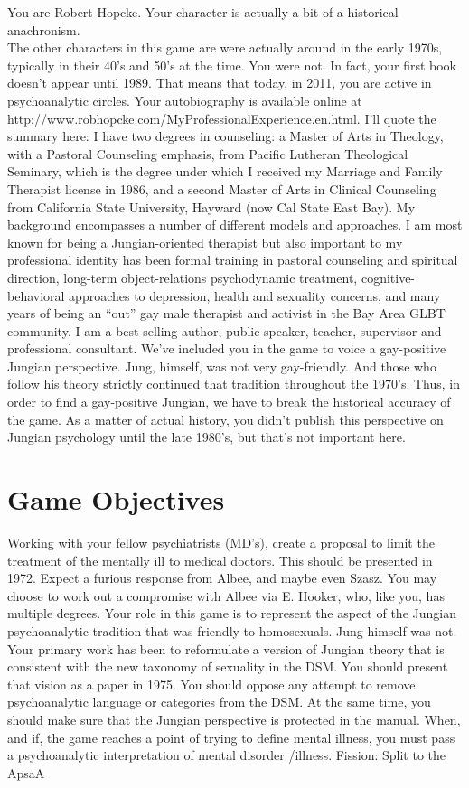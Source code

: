 You are Robert Hopcke. Your character is actually a bit of a historical anachronism.\\
The other characters in this game are were actually around in the early 1970s, typically in their 40's and 50's at the time. You were not. In fact, your first book doesn't appear until 1989. That means that today, in 2011, you are active in psychoanalytic circles. Your autobiography is available online at http:\slash \slash www.robhopcke.com\slash MyProfessionalExperience.en.html. I'll quote the summary here:
I have two degrees in counseling: a Master of Arts in Theology, with a Pastoral Counseling emphasis, from Pacific Lutheran Theological Seminary, which is the degree under which I received my Marriage and Family Therapist license in 1986, and a second Master of Arts in Clinical Counseling from California State University, Hayward (now Cal State East Bay). My background encompasses a number of different models and approaches. I am most known for being a Jungian-oriented therapist but also important to my professional identity has been formal training in pastoral counseling and spiritual direction, long-term object-relations psychodynamic treatment, cognitive-behavioral approaches to depression, health and sexuality concerns, and many years of being an ``out'' gay male therapist and activist in the Bay Area GLBT community. I am a best-selling author, public speaker, teacher, supervisor and professional consultant.
We've included you in the game to voice a gay-positive Jungian perspective. Jung, himself, was not very gay-friendly. And those who follow his theory strictly continued that tradition throughout the 1970’s. Thus, in order to find a gay-positive Jungian, we have to break the historical accuracy of the game. As a matter of actual history, you didn't publish this perspective on Jungian psychology until the late 1980's, but that's not important here.

\section{Game Objectives}
\label{gameobjectives}

Working with your fellow psychiatrists (MD's), create a proposal to limit the treatment of the mentally ill to medical doctors. This should be presented in 1972. Expect a furious response from Albee, and maybe even Szasz. You may choose to work out a compromise with Albee via E. Hooker, who, like you, has multiple degrees.
Your role in this game is to represent the aspect of the Jungian psychoanalytic tradition that was friendly to homosexuals. Jung himself was not. Your primary work has been to reformulate a version of Jungian theory that is consistent with the new taxonomy of sexuality in the DSM. You should present that vision as a paper in 1975.
You should oppose any attempt to remove psychoanalytic language or categories from the DSM. At the same time, you should make sure that the Jungian perspective is protected in the manual.
When, and if, the game reaches a point of trying to define mental illness, you must pass a psychoanalytic interpretation of mental disorder \slash  illness.
Fission: Split to the ApsaA


